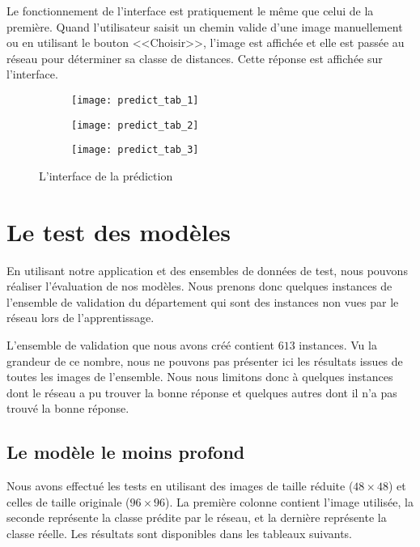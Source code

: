 Le fonctionnement de l'interface est pratiquement le même que celui de la première.
Quand l'utilisateur saisit un chemin valide d'une image manuellement ou en utilisant
le bouton <<Choisir>>, l'image est affichée et elle est passée au réseau pour
déterminer sa classe de distances. Cette réponse est affichée sur l'interface.

\begin{figure}[h]
\centering
\begin{subfigure}{0.32\textwidth}
  \texttt{[image: predict\_tab\_1]}
\end{subfigure}
\begin{subfigure}{0.32\textwidth}
  \texttt{[image: predict\_tab\_2]}
\end{subfigure}
\begin{subfigure}{0.32\textwidth}
  \texttt{[image: predict\_tab\_3]}
\end{subfigure}
\caption{L'interface de la prédiction}
\end{figure}

\section{Le test des modèles}

En utilisant notre application et des ensembles de données de test, nous pouvons
réaliser l'évaluation de nos modèles. Nous prenons donc quelques instances de
l'ensemble de validation du département qui sont des instances non vues par le
réseau lors de l'apprentissage.

L'ensemble de validation que nous avons créé contient $613$ instances. Vu la grandeur
de ce nombre, nous ne pouvons pas présenter ici les résultats issues de toutes les
images de l'ensemble. Nous nous limitons donc à quelques instances dont le réseau
a pu trouver la bonne réponse et quelques autres dont il n'a pas trouvé la bonne réponse.

\subsection{Le modèle le moins profond}

Nous avons effectué les tests en utilisant des images de taille réduite ($48 \times 48$)
et celles de taille originale ($96 \times 96$). La première colonne contient
l'image utilisée, la seconde représente la classe prédite par le réseau, et la dernière
représente la classe réelle. Les résultats sont disponibles dans les tableaux suivants.

